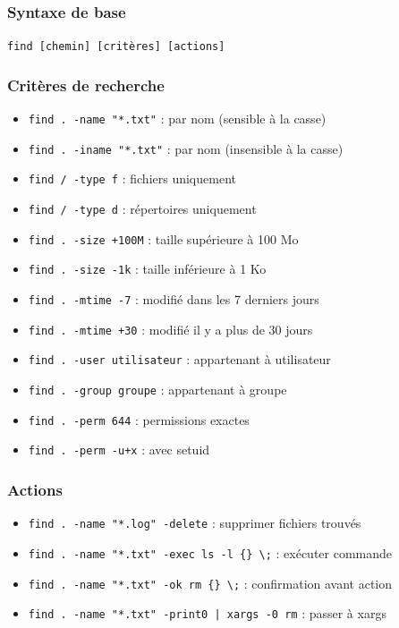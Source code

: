 \documentclass[12pt,a4paper]{article}
\begin{document}
\subsubsection{Syntaxe de base}
\texttt{find [chemin] [crit\`eres] [actions]}

\subsubsection{Crit\`eres de recherche}
\begin{itemize}
    \item \texttt{find . -name "*.txt"} : par nom (sensible \`a la casse) %
    \item \texttt{find . -iname "*.txt"} : par nom (insensible \`a la casse) %
    \item \texttt{find / -type f} : fichiers uniquement %
    \item \texttt{find / -type d} : r\'epertoires uniquement %
    \item \texttt{find . -size +100M} : taille sup\'erieure \`a 100 Mo %
    \item \texttt{find . -size -1k} : taille inf\'erieure \`a 1 Ko %
    \item \texttt{find . -mtime -7} : modifi\'e dans les 7 derniers jours %
    \item \texttt{find . -mtime +30} : modifi\'e il y a plus de 30 jours %
    \item \texttt{find . -user utilisateur} : appartenant \`a utilisateur %
    \item \texttt{find . -group groupe} : appartenant \`a groupe %
    \item \texttt{find . -perm 644} : permissions exactes %
    \item \texttt{find . -perm -u+x} : avec setuid %
\end{itemize}

\subsubsection{Actions}
\begin{itemize}
    \item \texttt{find . -name "*.log" -delete} : supprimer fichiers trouv\'es %
    \item \texttt{find . -name "*.txt" -exec ls -l \{\} \textbackslash;} : ex\'ecuter commande %
    \item \texttt{find . -name "*.txt" -ok rm \{\} \textbackslash;} : confirmation avant action %
    \item \texttt{find . -name "*.txt" -print0 | xargs -0 rm} : passer \`a xargs %
\end{itemize}
\end{document}
